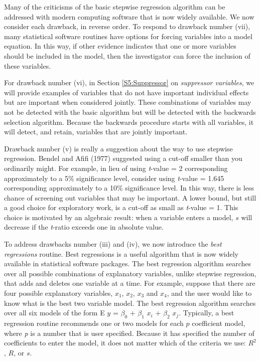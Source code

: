 Many of the criticisms of the basic stepwise regression algorithm
can be addressed with modern computing software that is now widely
available. We now consider each drawback, in reverse order. To
respond to drawback number (vii), many statistical software routines
have options for forcing variables into a model equation. In this
way, if other evidence indicates that one or more variables should
be included in the model, then the investigator can force the
inclusion of these variables.

For drawback number (vi), in Section \ref{S5:Suppressor} on
\textit{suppressor variables}, we will provide examples of variables
that do not have important individual effects but are important when
considered jointly. These combinations of variables may not be
detected with the basic algorithm but will be detected with the
backwards selection algorithm. Because the backwards procedure
starts with all variables, it will detect, and retain, variables
that are jointly important.

Drawback number (v) is really a suggestion about the way to use
stepwise regression. Bendel and Afifi (1977) suggested using a
cut-off smaller than you ordinarily might. For example, in lieu of
using \textit{t}-value = 2 corresponding approximately to a 5\%
significance level, consider using \textit{t}-value = 1.645
corresponding approximately to a 10\% significance level. In this
way, there is less chance of screening out variables that may be
important. A lower bound, but still a good choice for exploratory
work, is a cut-off as small as \textit{t}-value = 1. This choice is
motivated by an algebraic result: when a variable enters a model,
$s$ will decrease if the \textit{t}-ratio exceeds one in absolute
value.


To address drawbacks number (iii) and (iv), we now introduce the \textit{%
best regressions }routine. Best regressions is a useful algorithm that is
now widely available in statistical software packages. The best regression
algorithm searches over all possible combinations of explanatory variables,
unlike stepwise regression, that adds and deletes one variable at a time.
For example, suppose that there are four possible explanatory variables, $%
x_1$, $x_2$, $x_3$ and $x_4$, and the user would like to know what
is the best two variable model. The best regression algorithm
searches over all six models of the form E $y$ = $\beta_0$ +
$\beta_1$ $x_i$ + $\beta_2$ $x_j$. Typically, a best regression
routine recommends one or two models for each $p$ coefficient model,
where \textit{p} is a number that is user specified. Because it has
specified the number of coefficients to enter the model, it does not
matter which of the criteria we use: $R^2$, $R$, or $s$.

